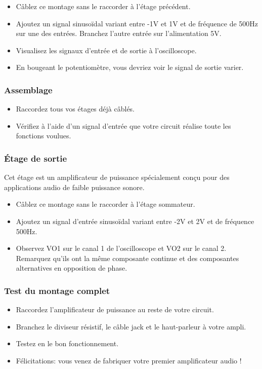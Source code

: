 \begin{itemize}
\item Câblez ce montage sans le raccorder à l’étage précédent.
\item Ajoutez un signal sinusoïdal variant entre -1V et 1V et de fréquence de 500Hz sur une des entrées. Branchez l’autre entrée sur l’alimentation 5V.
\item Visualisez les signaux d’entrée et de sortie à l’oscilloscope.
\item En bougeant le potentiomètre, vous devriez voir le signal de sortie varier.
\end{itemize}
\subsubsection{Assemblage}
\begin{itemize}
\item Raccordez tous vos étages déjà câblés.
\item Vérifiez à l’aide d’un signal d’entrée que votre circuit réalise toute les fonctions voulues.
\end{itemize}

\subsubsection{Étage de sortie}
Cet étage est un amplificateur de puissance spécialement conçu pour des applications audio de faible puissance sonore.

\begin{itemize}
\item Câblez ce montage sans le raccorder à l’étage sommateur.
\item Ajoutez un signal d’entrée sinusoïdal variant entre -2V et 2V et de fréquence 500Hz.
\item Observez VO1 sur le canal 1 de l’oscilloscope et VO2 sur le canal 2. Remarquez qu’ils ont la même composante continue et des composantes alternatives en opposition de phase.
\end{itemize}

\subsubsection{Test du montage complet}
\begin{itemize}
\item Raccordez l'amplificateur de puissance au reste de votre circuit.
\item Branchez le diviseur résistif, le câble jack et le haut-parleur à votre ampli.
\item Testez en le bon fonctionnement.
\item Félicitations: vous venez de fabriquer votre premier amplificateur audio !
\end{itemize}











